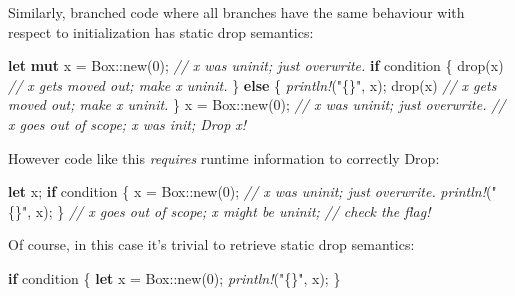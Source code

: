 \documentclass[a4paper,]{book}
\newenvironment{Shaded}{\begin{snugshade}}{\end{snugshade}}
\newcommand{\KeywordTok}[1]{\textcolor[rgb]{0.13,0.29,0.53}{\textbf{{#1}}}}
\newcommand{\DataTypeTok}[1]{\textcolor[rgb]{0.13,0.29,0.53}{{#1}}}
\newcommand{\DecValTok}[1]{\textcolor[rgb]{0.00,0.00,0.81}{{#1}}}
\newcommand{\StringTok}[1]{\textcolor[rgb]{0.31,0.60,0.02}{{#1}}}
\newcommand{\CommentTok}[1]{\textcolor[rgb]{0.56,0.35,0.01}{\textit{{#1}}}}
\newcommand{\PreprocessorTok}[1]{\textcolor[rgb]{0.56,0.35,0.01}{\textit{{#1}}}}
\newcommand{\NormalTok}[1]{{#1}}
\begin{document}
Similarly, branched code where all branches have the same behaviour with
respect to initialization has static drop semantics:

\begin{Shaded}
\begin{Highlighting}[]
\KeywordTok{let} \KeywordTok{mut} \NormalTok{x = }\DataTypeTok{Box}\NormalTok{::new(}\DecValTok{0}\NormalTok{);    }\CommentTok{// x was uninit; just overwrite.}
\KeywordTok{if} \NormalTok{condition \{}
    \NormalTok{drop(x)                 }\CommentTok{// x gets moved out; make x uninit.}
\NormalTok{\} }\KeywordTok{else} \NormalTok{\{}
    \PreprocessorTok{println!}\NormalTok{(}\StringTok{"\{\}"}\NormalTok{, x);}
    \NormalTok{drop(x)                 }\CommentTok{// x gets moved out; make x uninit.}
\NormalTok{\}}
\NormalTok{x = }\DataTypeTok{Box}\NormalTok{::new(}\DecValTok{0}\NormalTok{);            }\CommentTok{// x was uninit; just overwrite.}
                            \CommentTok{// x goes out of scope; x was init; Drop x!}
\end{Highlighting}
\end{Shaded}

However code like this \emph{requires} runtime information to correctly
Drop:

\begin{Shaded}
\begin{Highlighting}[]
\KeywordTok{let} \NormalTok{x;}
\KeywordTok{if} \NormalTok{condition \{}
    \NormalTok{x = }\DataTypeTok{Box}\NormalTok{::new(}\DecValTok{0}\NormalTok{);        }\CommentTok{// x was uninit; just overwrite.}
    \PreprocessorTok{println!}\NormalTok{(}\StringTok{"\{\}"}\NormalTok{, x);}
\NormalTok{\}}
                            \CommentTok{// x goes out of scope; x might be uninit;}
                            \CommentTok{// check the flag!}
\end{Highlighting}
\end{Shaded}

Of course, in this case it's trivial to retrieve static drop semantics:

\begin{Shaded}
\begin{Highlighting}[]
\KeywordTok{if} \NormalTok{condition \{}
    \KeywordTok{let} \NormalTok{x = }\DataTypeTok{Box}\NormalTok{::new(}\DecValTok{0}\NormalTok{);}
    \PreprocessorTok{println!}\NormalTok{(}\StringTok{"\{\}"}\NormalTok{, x);}
\NormalTok{\}}
\end{Highlighting}
\end{Shaded}
\end{document}
